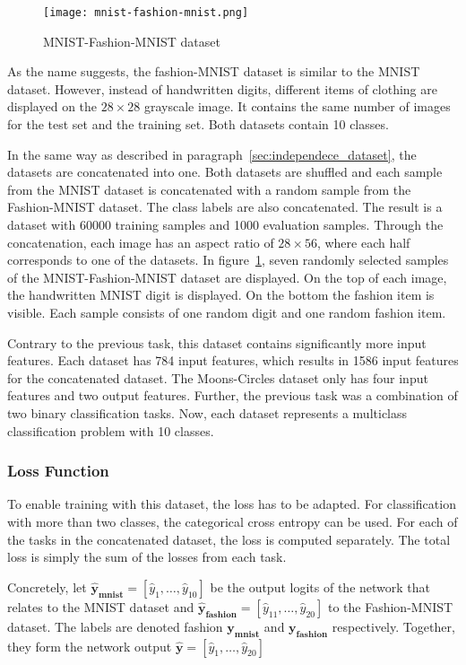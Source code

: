 \begin{figure}[ht]
    \centering
    \texttt{[image: mnist-fashion-mnist.png]}
    \caption{
        MNIST-Fashion-MNIST dataset
    }\label{fig:mnist_fashion}
\end{figure}

As the name suggests, the fashion-MNIST dataset \autocite{fashion} is similar to the MNIST dataset.
However, instead of handwritten digits, different items of clothing are displayed on the $28 \times 28$ grayscale image.
It contains the same number of images for the test set and the training set.
Both datasets contain 10 classes.

In the same way as described in paragraph~\ref{sec:independece_dataset}, the datasets are concatenated into one.
Both datasets are shuffled and each sample from the MNIST dataset is concatenated with a random sample from the Fashion-MNIST dataset.
The class labels are also concatenated.
The result is a dataset with 60000 training samples and 1000 evaluation samples.
Through the concatenation, each image has an aspect ratio of $28 \times 56$, where each half corresponds to one of the datasets.
In figure~\ref{fig:mnist_fashion}, seven randomly selected samples of the  MNIST-Fashion-MNIST dataset are displayed.
On the top of each image, the handwritten MNIST digit is displayed. 
On the bottom the fashion item is visible.
Each sample consists of one random digit and one random fashion item. 

Contrary to the previous task, this dataset contains significantly more input features.
Each dataset has 784 input features, which results in 1586 input features for the concatenated dataset.
The Moons-Circles dataset only has four input features and two output features.
Further, the previous task was a combination of two binary classification tasks.
Now, each dataset represents a multiclass classification problem with 10 classes.

\subsubsection{Loss Function}
To enable training with this dataset, the loss has to be adapted.
For classification with more than two classes, the categorical cross entropy can be used.
For each of the tasks in the concatenated dataset, the loss is computed separately.
The total loss is simply the sum of the losses from each task.

Concretely, let $\mathbf{\hat y_{mnist}} = \left[\hat y_1, \dots, \hat y_{10}\right]$ be the output logits of the network that relates to the MNIST dataset and $\mathbf{\hat y_{fashion}} = \left[\hat y_{11}, \dots, \hat y_{20}\right]$ to the Fashion-MNIST dataset.
The labels are denoted fashion $\mathbf{y_{mnist}}$ and $\mathbf{y_{fashion}}$ respectively.
Together, they form the network output $\mathbf{\hat y} = \left[\hat y_1, \dots, \hat y_{20}\right]$

